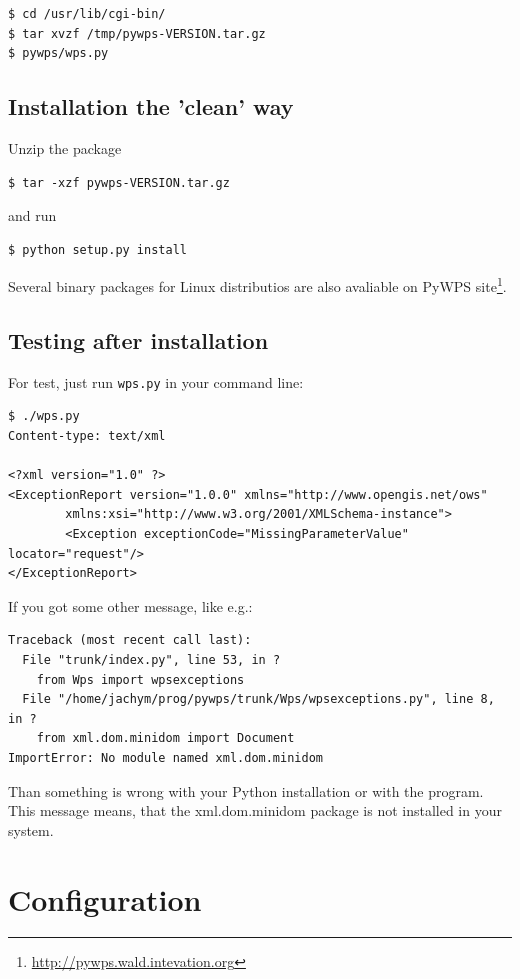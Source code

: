 \documentclass[a4paper,11pt]{article}
\newcommand{\pywpssite}{\url{http://pywps.wald.intevation.org}}
\begin{document}
\begin{verbatim}
$ cd /usr/lib/cgi-bin/
$ tar xvzf /tmp/pywps-VERSION.tar.gz
$ pywps/wps.py
\end{verbatim}

\subsection{Installation the 'clean' way}
Unzip the package 
\begin{verbatim}
$ tar -xzf pywps-VERSION.tar.gz
\end{verbatim}
and run 
\begin{verbatim}
$ python setup.py install
\end{verbatim} 

Several binary packages for Linux distributios are also avaliable on PyWPS
site\footnote{\pywpssite}.

\subsection{Testing after installation}
For test, just run
\texttt{wps.py} in your command line:
    
\begin{verbatim}
$ ./wps.py
Content-type: text/xml

<?xml version="1.0" ?>
<ExceptionReport version="1.0.0" xmlns="http://www.opengis.net/ows" 
        xmlns:xsi="http://www.w3.org/2001/XMLSchema-instance">
        <Exception exceptionCode="MissingParameterValue" locator="request"/>
</ExceptionReport>
    \end{verbatim}

     
If you got some other message, like e.g.:
     

    \begin{verbatim}
Traceback (most recent call last):
  File "trunk/index.py", line 53, in ?
    from Wps import wpsexceptions
  File "/home/jachym/prog/pywps/trunk/Wps/wpsexceptions.py", line 8, in ?
    from xml.dom.minidom import Document
ImportError: No module named xml.dom.minidom
    \end{verbatim}

     
Than something is wrong with your Python installation or with the program.
This message means, that the xml.dom.minidom package is not installed in
your system.
     


    
\section{Configuration}
    
\end{document}
